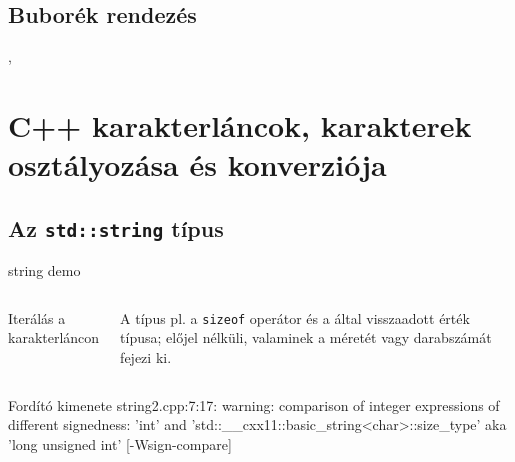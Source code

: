 \documentclass[usenames,dvipsnames,aspectratio=169]{beamer}
\begin{document}
\subsection{Buborék rendezés}
\begin{frame}
  \begin{exampleblock}{ , %
    }
    \tiny
    \vspace{-.2cm}
    
    \vspace{-.2cm}
  \end{exampleblock}
\end{frame}

\section{C++ karakterláncok, karakterek osztályozása és konverziója}
\subsection{Az \texttt{std::string} típus}
\begin{frame}
  \begin{exampleblock}{ string demo}
    \scriptsize
    \vspace{-.2cm}
    
    \vspace{-.2cm}
  \end{exampleblock}
\end{frame}

\begin{frame}
  \begin{columns}[c]
      \begin{exampleblock}{ Iterálás a karakterláncon}
        \scriptsize
        \vspace{-.2cm}
        
        \vspace{-.2cm}
      \end{exampleblock}
      A  típus pl. a \texttt{sizeof} operátor és a  által visszaadott érték típusa; előjel nélküli, valaminek a méretét vagy darabszámát fejezi ki.
\end{columns}
  \begin{block}{Fordító kimenete}
    \scriptsize
    string2.cpp:7:17: warning: comparison of integer expressions of different signedness: 'int' and 'std::\_\_cxx11::basic\_string<char>::size\_type' {aka 'long unsigned int'} [-Wsign-compare]
  \end{block}
\end{frame}
\end{document}
